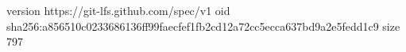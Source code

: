 version https://git-lfs.github.com/spec/v1
oid sha256:a856510c0233686136ff99faecfef1fb2cd12a72cc5ecca637bd9a2e5fedd1c9
size 797
